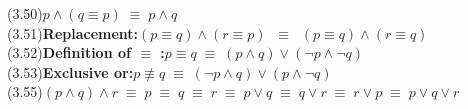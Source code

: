 \documentclass{amsart}
\newcommand{\lgap}{2pt}                             %
\newcommand{\equivs}{\ensuremath{\;\equiv\;}}       %
\newcommand{\equivss}{\ensuremath{\;\;\equiv\;\;}}  %
\newcommand{\nequiv}{\ensuremath{\not\equiv}}       %
\begin{document}
\begin{tabbing}
(3.50)\>$p\land (q\equiv p)\equivs p\land q$\\[\lgap]
(3.51)\>\textbf{Replacement:}\quad $(p \equiv q) \land (r \equiv p) \equivss (p \equiv q) \land (r \equiv q)$\\[\lgap]
(3.52)\>\textbf{Definition of $\equiv$ :}\quad $p \equiv q \equivs (p \land q) \lor (\neg p \land \neg q)$\\[\lgap]
(3.53)\>\textbf{Exclusive or:}\quad $p \nequiv q \equivs (\neg p \land q) \lor (p \land \neg q)$\\[\lgap]
(3.55)\>$(p\land q)\land r \equivs p \equivs q \equivs r \equivs p\lor q \equivs q\lor r \equivs r\lor p \equivs p \lor q\lor r$\\
\end{tabbing}

\end{document}
